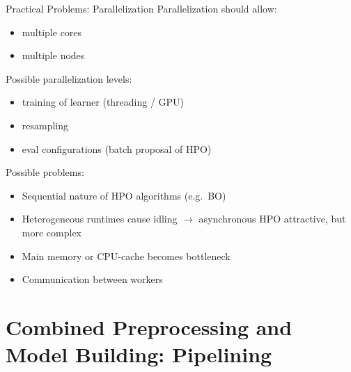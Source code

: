\begin{frame}{Practical Problems: Parallelization}
  Parallelization should allow:
  \begin{itemize}
    \item multiple cores
    \item multiple nodes 
  \end{itemize}

  Possible parallelization levels:
  \begin{itemize}
    \item training of learner (threading / GPU)
    \item resampling
    \item eval configurations (batch proposal of HPO)
  \end{itemize}

  Possible problems:
  \begin{itemize}
    \item Sequential nature of HPO algorithms (e.g.\ BO)
    \item Heterogeneous runtimes cause idling $\longrightarrow$ 
        asynchronous HPO attractive, but more complex
    \item Main memory or CPU-cache becomes bottleneck
    \item Communication between workers
  \end{itemize}

\end{frame}


\section{Combined Preprocessing and Model Building: Pipelining}

